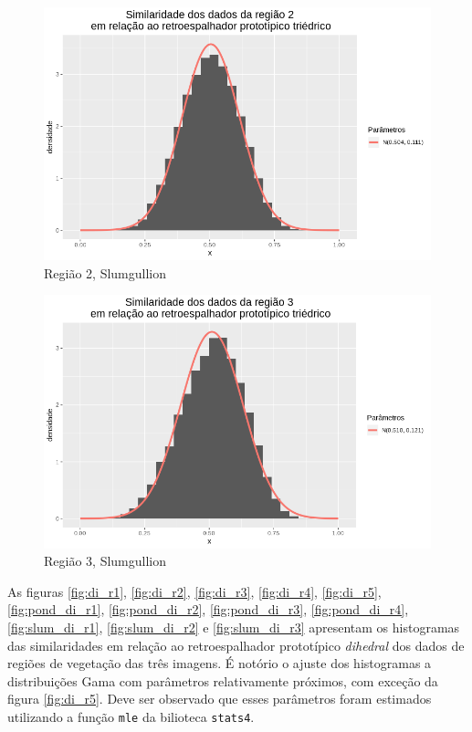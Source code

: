 \documentclass[12pt]{article}
\begin{document}
\begin{figure}[!h]
    \centering
    \vspace{0.1\linewidth}
    \includegraphics[width = \linewidth]{../../Images/Report_18_12_20/slum_tri_region2.png}
    \caption{Região 2, Slumgullion}
    \label{fig:slum_tri_r2}
\end{figure}

\begin{figure}[!h]
    \centering
    \vspace{0.1\linewidth}
    \includegraphics[width = \linewidth]{../../Images/Report_18_12_20/slum_tri_region3.png}
    \caption{Região 3, Slumgullion}
    \label{fig:slum_tri_r3}
\end{figure}


As figuras \ref{fig:di_r1}, \ref{fig:di_r2}, \ref{fig:di_r3}, \ref{fig:di_r4}, \ref{fig:di_r5}, \ref{fig:pond_di_r1}, \ref{fig:pond_di_r2}, \ref{fig:pond_di_r3}, \ref{fig:pond_di_r4},  \ref{fig:slum_di_r1}, \ref{fig:slum_di_r2} e \ref{fig:slum_di_r3} apresentam os histogramas das similaridades em relação ao retroespalhador prototípico \textit{dihedral} dos dados de regiões de vegetação das três imagens. É notório o ajuste dos histogramas a distribuições Gama com parâmetros relativamente próximos, com exceção da figura \ref{fig:di_r5}. Deve ser observado que esses parâmetros foram estimados utilizando a função \texttt{mle} da bilioteca \texttt{stats4}.
\end{document}
